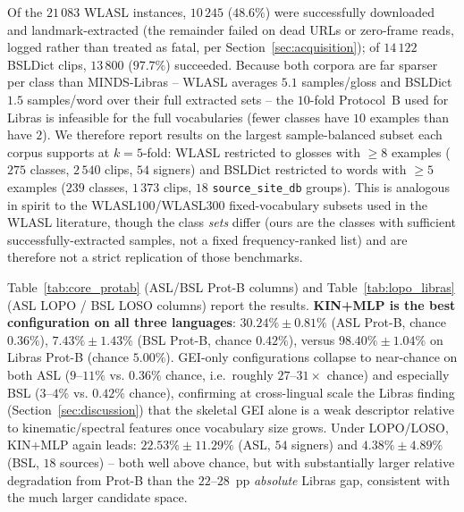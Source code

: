 \documentclass[journal]{IEEEtran}
\begin{document}
Of the $21\,083$ WLASL instances, $10\,245$ ($48.6\%$) were successfully downloaded and landmark-extracted (the remainder failed on dead URLs or zero-frame reads, logged rather than treated as fatal, per Section~\ref{sec:acquisition}); of $14\,122$ BSLDict clips, $13\,800$ ($97.7\%$) succeeded. Because both corpora are far sparser per class than MINDS-Libras -- WLASL averages $5.1$ samples/gloss and BSLDict $1.5$ samples/word over their full extracted sets -- the $10$-fold Protocol~B used for Libras is infeasible for the full vocabularies (fewer classes have $10$ examples than have $2$). We therefore report results on the largest sample-balanced subset each corpus supports at $k{=}5$-fold: WLASL restricted to glosses with $\geq 8$ examples ($275$ classes, $2\,540$ clips, $54$ signers) and BSLDict restricted to words with $\geq 5$ examples ($239$ classes, $1\,373$ clips, $18$ \texttt{source\_site\_db} groups). This is analogous in spirit to the WLASL100/WLASL300 fixed-vocabulary subsets used in the WLASL literature, though the class \emph{sets} differ (ours are the classes with sufficient successfully-extracted samples, not a fixed frequency-ranked list) and are therefore not a strict replication of those benchmarks.

Table~\ref{tab:core_protab} (ASL/BSL Prot-B columns) and Table~\ref{tab:lopo_libras} (ASL LOPO / BSL LOSO columns) report the results. \textbf{KIN+MLP is the best configuration on all three languages}: $30.24\%\pm0.81\%$ (ASL Prot-B, chance $0.36\%$), $7.43\%\pm1.43\%$ (BSL Prot-B, chance $0.42\%$), versus $98.40\%\pm1.04\%$ on Libras Prot-B (chance $5.00\%$). GEI-only configurations collapse to near-chance on both ASL ($9$--$11\%$ vs. $0.36\%$ chance, i.e.\ roughly $27$--$31\times$ chance) and especially BSL ($3$--$4\%$ vs. $0.42\%$ chance), confirming at cross-lingual scale the Libras finding (Section~\ref{sec:discussion}) that the skeletal GEI alone is a weak descriptor relative to kinematic/spectral features once vocabulary size grows. Under LOPO/LOSO, KIN+MLP again leads: $22.53\%\pm11.29\%$ (ASL, $54$ signers) and $4.38\%\pm4.89\%$ (BSL, $18$ sources) -- both well above chance, but with substantially larger relative degradation from Prot-B than the $22$--$28$~pp \emph{absolute} Libras gap, consistent with the much larger candidate space.
\end{document}
